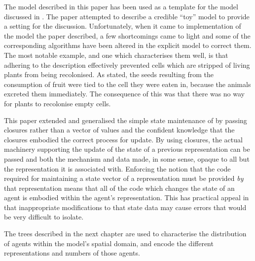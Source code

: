 The model described in this paper has been used as a template for the
model discussed in \Cfive. The paper attempted to
describe a credible ``toy'' model to provide a setting for the
discussion. Unfortunately, when it came to implementation of the model
the paper described, a few shortcomings came to light and some of the
corresponding algorithms have been altered in the explicit
model to correct them.  The most notable example, and one which
characterises them well, is that adhering to the description
effectively prevented cells which are stripped of living plants from
being recolonised.  As stated, the seeds resulting from the
consumption of fruit were tied to the cell they were eaten in, because
the animals excreted them immediately. The consequence of this was
that there was no way for plants to recolonise empty cells.

This paper extended and generalised the simple state maintenance of
\Ctwo by passing closures rather than a vector
of values and the confident knowledge that the closures embodied the
correct process for update. By using closures, the actual machinery
supporting the update of the state of a previous representation can be
passed and both the mechanism and data made, in some sense, opaque to
all but the representation it is associated with. Enforcing the notion
that the code required for maintaining a state vector of a
representation must be provided \emph{by} that representation means
that all of the code which changes the state of an agent is embodied
within the agent's representation.  This has practical appeal in that
inappropriate modifications to that state data may cause errors that
would be very difficult to isolate.

The trees described in the next chapter are used to characterise the
distribution of agents within the model's spatial domain, and encode
the different representations and numbers of those agents. 

